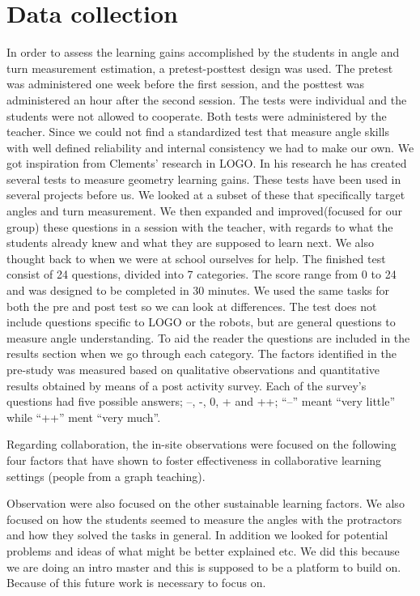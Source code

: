 \chapter{Data collection}
In order to assess the learning gains accomplished by the students in angle and turn measurement estimation, a pretest-posttest design was used. The pretest was administered one week before the first session, and the posttest was administered an hour after the second session. The tests were individual and the students were not allowed to cooperate. Both tests were administered by the teacher. Since we could not find a standardized test that measure angle skills with well defined reliability and internal consistency we had to make our own. We got inspiration from Clements' research in LOGO. In his research he has created several tests to measure geometry learning gains. These tests have been used in several projects before us. We looked at a subset of these that specifically target angles and turn measurement. We then expanded and improved(focused for our group) these questions in a session with the teacher, with regards to what the students already knew and what they are supposed to learn next. We also thought back to when we were at school ourselves for help. The finished test consist of 24 questions, divided into 7 categories. The score range from 0 to 24 and was designed to be completed in 30 minutes. We used the same tasks for both the pre and post test so we can look at differences. The test does not include questions specific to LOGO or the robots, but are general questions to measure angle understanding. To aid the reader the questions are included in the results section when we go through each category. The factors identified in the pre-study was measured based on qualitative observations and quantitative results obtained by means of a post activity survey. Each of the survey's questions had five possible answers; --, -, 0, + and ++; "`--"' meant "`very little"' while "`++"' ment "`very much"'.

\bigskip\noindent
Regarding collaboration, the in-site observations were focused on the following four factors that have shown to foster effectiveness in collaborative learning settings (people from a graph teaching).

\bigskip\noindent
Observation were also focused on the other sustainable learning factors. We also focused on how the students seemed to measure the angles with the protractors and how they solved the tasks in general. In addition we looked for potential problems and ideas of what might be better explained etc. We did this because we are doing an intro master and this is supposed to be a platform to build on. Because of this future work is necessary to focus on. 

